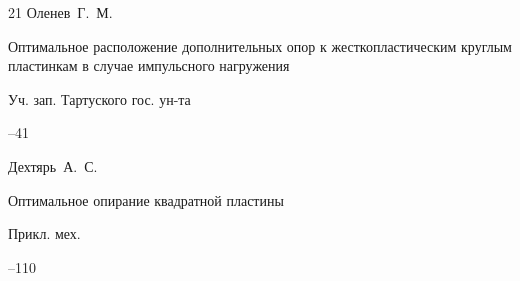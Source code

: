 \begin{thebibliography}{21}
\by Оленев~Г.~М.

\paper Оптимальное расположение дополнительных опор к жесткопластическим круглым пластинкам в случае импульсного нагружения

\jour Уч.  зап.  Тартуского гос. ун-та



--41

























\by Дехтярь~А.~С.

\paper Оптимальное опирание квадратной пластины

\jour Прикл. мех.




--110






\end{thebibliography}
